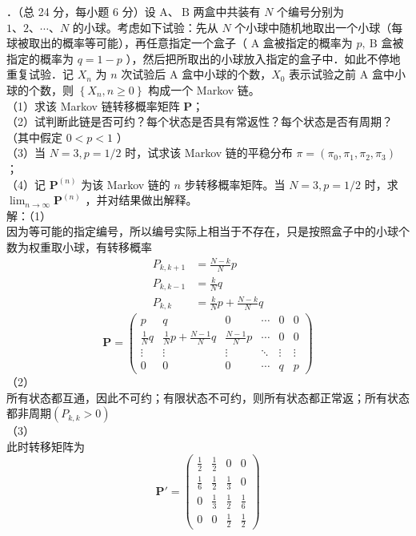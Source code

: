 \documentclass[UTF8,openany]{book}
\begin{document}
．（总 24 分，每小题 6 分）设 $\mathrm{A} 、 \mathrm{~B}$ 两盒中共装有 $N$ 个编号分别为 $1 、 2 、 \cdots 、 N$ 的小球。考虑如下试验：先从 $N$ 个小球中随机地取出一个小球（每球被取出的概率等可能），再任意指定一个盒子（ A 盒被指定的概率为 $p, \mathrm{~B}$ 盒被指定的概率为 $q=1-p$ ），然后把所取出的小球放入指定的盒子中．如此不停地重复试验．记 $X_{n}$ 为 $n$ 次试验后 A 盒中小球的个数，$X_{0}$ 表示试验之前 A 盒中小球的个数，则 $\left\{X_{n}, n \geq 0\right\}$ 构成一个 Markov 链。\\
（1）求该 Markov 链转移概率矩阵 $\mathbf{P}$；\\
（2）试判断此链是否可约？每个状态是否具有常返性？每个状态是否有周期？（其中假定 $0<p<1$ ）\\
（3）当 $N=3, p=1 / 2$ 时，试求该 Markov 链的平稳分布 $\pi=\left(\pi_{0}, \pi_{1}, \pi_{2}, \pi_{3}\right)$ ；\\
（4）记 $\mathbf{P}^{(n)}$ 为该 Markov 链的 $n$ 步转移概率矩阵。当 $N=3, p=1 / 2$ 时，求 $\lim _{n \rightarrow \infty} \mathbf{P}^{(n)}$ ，并对结果做出解释。\\
解：（1）\\
因为等可能的指定编号，所以编号实际上相当于不存在，只是按照盒子中的小球个数为权重取小球，有转移概率\\
\[
\begin{aligned}
	P_{k,k+1}&=\frac{N-k}{N}p \\
	P_{k,k-1}&=\frac{k}{N}q \\
	P_{k,k}&=\frac{k}{N}p+\frac{N-k}{N}q
\end{aligned}
\]
\[
\mathbf{P}=
\begin{pmatrix}
	p & q & 0 & \cdots & 0 & 0 \\
	\frac{1}{N}q & \frac{1}{N}p + \frac{N-1}{N}q & \frac{N-1}{N}p & \cdots & 0 & 0 \\
	\vdots & \vdots & \vdots & \ddots & \vdots & \vdots \\
	0 & 0 & 0 & \cdots & q & p
\end{pmatrix}
\]
（2）\\
所有状态都互通，因此不可约；有限状态不可约，则所有状态都正常返；所有状态都非周期$(P_{k,k}>0)$\\
（3）\\
此时转移矩阵为\\
\[
\mathbf{P'}=
\begin{pmatrix}
	\frac{1}{2}  &\frac{1}{2}&0&0\\
	\frac{1}{6} & \frac{1}{2} &\frac{1}{3} &0\\
	0&\frac{1}{3} &\frac{1}{2}&\frac{1}{6}\\
	0&0&\frac{1}{2}&\frac{1}{2}
\end{pmatrix}
\]
\end{document}

